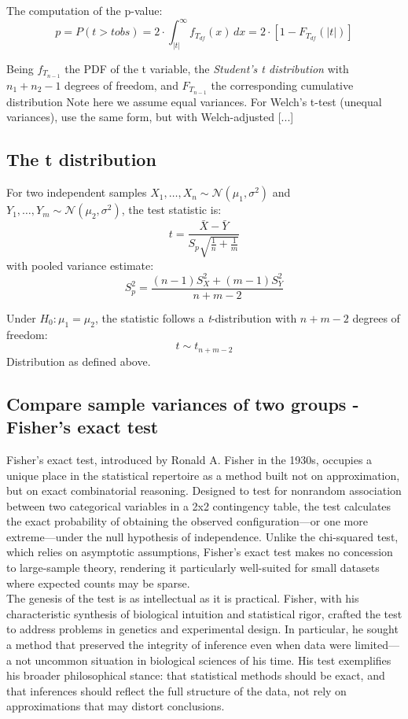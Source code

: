 \documentclass{book}
\begin{document}
The computation of the p-value:
\[
p = P\left(t > t obs \right) = 2 \cdot \int_{|t|}^{\infty} f_{T_{df}}(x)\,dx = 2 \cdot \left[1 - F_{T_{df}}(|t|)\right]
\]

Being $f_{T_{n-1}}$ the PDF of the t variable, the \textit{Student's t distribution} with $n_1 + n_2 - 1$ degrees of freedom, and $F_{T_{n-1}}$ the corresponding cumulative distribution
Note here we assume equal variances. For Welch’s t-test (unequal variances), use the same form, but with Welch-adjusted [...]

\subsection*{The t distribution}

For two independent samples \( X_1, \ldots, X_n \sim \mathcal{N}(\mu_1, \sigma^2) \) and \( Y_1, \ldots, Y_m \sim \mathcal{N}(\mu_2, \sigma^2) \), the test statistic is:
\[
t = \frac{\bar{X} - \bar{Y}}{S_p \sqrt{\frac{1}{n} + \frac{1}{m}}}
\]
with pooled variance estimate:
\[
S_p^2 = \frac{(n-1)S_X^2 + (m-1)S_Y^2}{n + m - 2}
\]

Under \( H_0: \mu_1 = \mu_2 \), the statistic follows a \textit{t}-distribution with \( n + m - 2 \) degrees of freedom:
\[
t \sim t_{n+m-2}
\]
Distribution as defined above.

\newpage

\subsection{Compare sample variances of two groups - Fisher's exact test}

Fisher’s exact test, introduced by Ronald A. Fisher in the 1930s, occupies a unique place in the statistical repertoire as a method built not on approximation, but on exact combinatorial reasoning. Designed to test for nonrandom association between two categorical variables in a 2x2 contingency table, the test calculates the exact probability of obtaining the observed configuration—or one more extreme—under the null hypothesis of independence. Unlike the chi-squared test, which relies on asymptotic assumptions, Fisher’s exact test makes no concession to large-sample theory, rendering it particularly well-suited for small datasets where expected counts may be sparse.\\

The genesis of the test is as intellectual as it is practical. Fisher, with his characteristic synthesis of biological intuition and statistical rigor, crafted the test to address problems in genetics and experimental design. In particular, he sought a method that preserved the integrity of inference even when data were limited—a not uncommon situation in biological sciences of his time. His test exemplifies his broader philosophical stance: that statistical methods should be exact, and that inferences should reflect the full structure of the data, not rely on approximations that may distort conclusions.\\
\end{document}
